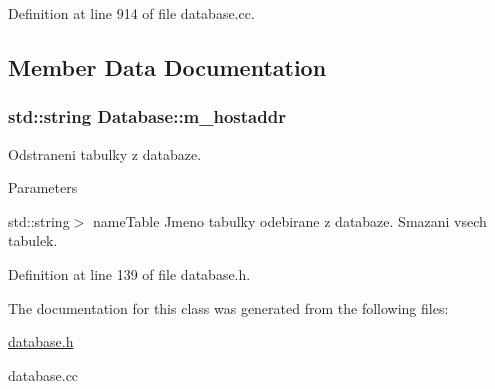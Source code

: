 Definition at line 914 of file database.cc.



\subsection{Member Data Documentation}
\hypertarget{classDatabase_a73a3ea4197118649af11db64a0905f26}{
\subsubsection[{m\_\-hostaddr}]{\setlength{\rightskip}{0pt plus 5cm}std::string {\bf Database::m\_\-hostaddr}}}
\label{classDatabase_a73a3ea4197118649af11db64a0905f26}
Odstraneni tabulky z databaze. 
\begin{DoxyParams}{Parameters}
\item[\mbox{\tt[in]} {\em $<$const}]std::string$>$ nameTable Jmeno tabulky odebirane z databaze. Smazani vsech tabulek. \end{DoxyParams}


Definition at line 139 of file database.h.



The documentation for this class was generated from the following files:\begin{DoxyCompactItemize}
\item 
\hyperlink{database_8h}{database.h}\item 
database.cc\end{DoxyCompactItemize}
